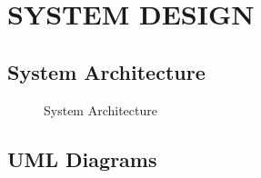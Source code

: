 \chapter{SYSTEM DESIGN}
\section {System Architecture}
\begin{figure}[htb]
\centering
\setlength\fboxsep{0pt}
\setlength\fboxrule{0.5pt}
\caption{System Architecture}
\label{fig:sys_arch}
\end{figure}

\newpage
\section {UML Diagrams}

